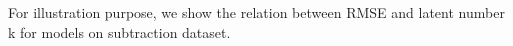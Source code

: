 \documentclass[11pt]{article}
\begin{document}
For illustration purpose, we show the relation between RMSE and latent number k for models on subtraction dataset.
%
%
%
	


\end{document}
